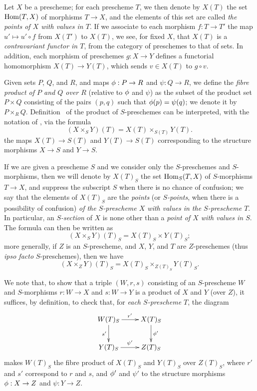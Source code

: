 \begin{env}[3.4.1]
\label{I.3.4.1}
Let $X$ be a prescheme; for each prescheme $T$, we then denote by $X(T)$ the set
$\operatorname{Hom}(T,X)$ of morphisms $T\to X$, and the elements of this set are called
\emph{the points of $X$ with values in $T$}. If we associate to each morphism
$f:T\to T'$ the map $u'\mapsto u'\circ f$ from $X(T')$ to $X(T)$, we see,
for fixed $X$, that $X(T)$ is a \emph{contravariant functor in $T$}, from the
category of preschemes to that of sets. In addition, each morphism of preschemes
$g:X\to Y$ defines a functorial homomorphism $X(T)\to Y(T)$, which sends
$v\in X(T)$ to $g\circ v$.
\end{env}

\begin{env}[3.4.2]
\label{I.3.4.2}
Given sets $P$, $Q$, and $R$, and maps $\vphi:P\to R$ and $\psi:Q\to R$, we define the
\emph{fibre product of $P$ and $Q$ over $R$} (relative to $\phi$ and $\psi$) as the subset
of
the product set $P\times Q$ consisting of the pairs $(p,q)$ such that $\phi(p)=\psi(q)$; we
denote it by $P\times_R Q$. Definition~ of the product
of $S$-preschemes can be interpreted, with the notation of ,
via the formula
\[
\label{I.3.4.2.1}
  (X\times_S Y)(T)=X(T)\times_{S(T)}Y(T).
  \tag{3.4.2.1}
\]
the maps $X(T)\to S(T)$ and $Y(T)\to S(T)$ corresponding to the structure morphisms
$X\to S$ and $Y\to S$.
\end{env}

\begin{env}[3.4.3]
\label{I.3.4.3}
If we are given a prescheme $S$ and we consider only the $S$-preschemes and $S$-morphisms,
then we will denote by $X(T)_S$ the set $\operatorname{Hom}_S(T,X)$ of $S$-morphisms $T\to X$, and suppress
the subscript $S$ when there is no chance of confusion; we say that the elements of $X(T)_S$
are the \emph{points} (or \emph{$S$-points}, when there is a possibility of confusion)
\emph{of the $S$-prescheme $X$ with values in the $S$-prescheme $T$}. In particular, an
\emph{$S$-section} of $X$ is none other than a \emph{point of $X$ with values in $S$}. The
formula  can then be written as
\[
\label{I.3.4.3.1}
  (X\times_S Y)(T)_S=X(T)_S\times Y(T)_S;
  \tag{3.4.3.1}
\]
more generally, if $Z$ is an $S$-prescheme, and $X$, $Y$, and $T$ are $Z$-preschemes (thus
\emph{ipso facto} $S$-preschemes), then we have
\[
\label{I.3.4.3.2}
  (X\times_Z Y)(T)_S=X(T)_S\times_{Z(T)_S}Y(T)_S.
  \tag{3.4.3.2}
\]

We note that, to show that a triple $(W,r,s)$ consisting of an $S$-prescheme $W$ and
$S$-morphisms $r:W\to X$ and $s:W\to Y$ is a product of $X$ and $Y$ (over $Z$), it suffices, by
definition, to check that, for \emph{each $S$-prescheme $T$}, the diagram
\[
  \xymatrix{
    W(T)_S\ar[r]^{r'}\ar[d]_{s'} &
    X(T)_S\ar[d]^{\vphi'}\\
    Y(T)_S\ar[r]^{\psi'} &
    Z(T)_S
  }
\]
makes $W(T)_S$ the fibre product of $X(T)_S$ and $Y(T)_S$ over $Z(T)_S$, where $r'$ and $s'$
correspond to $r$ and $s$, and $\phi'$ and $\psi'$ to the structure morphisms $\vphi:X\to Z$ and $\psi:Y\to Z$.
\end{env}

